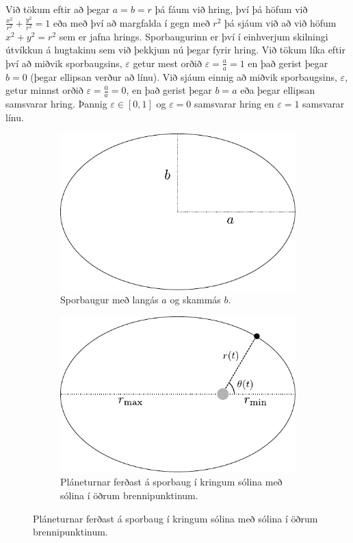 \ifdefined \wholebook \else\documentclass[oneside]{book}\usepackage{EdlBook}\graphicspath{{figures/}}
\begin{document}
Við tökum eftir að þegar $a = b = r$ þá fáum við hring, því þá höfum við $\frac{x^2}{r^2}+ \frac{y^2}{r^2} = 1$ eða með því að margfalda í gegn með $r^2$ þá sjáum við að við höfum $x^2 + y^2 = r^2$ sem er jafna hrings. Sporbaugurinn er því í einhverjum skilningi útvíkkun á hugtakinu sem við þekkjum nú þegar fyrir hring. Við tökum líka eftir því að miðvik sporbaugsins, $\varepsilon$ getur mest orðið $\varepsilon = \frac{a}{a} = 1$ en það gerist þegar $b = 0$ (þegar ellipsan verður að línu). Við sjáum einnig að miðvik sporbaugsins, $\varepsilon$, getur minnst orðið $\varepsilon = \frac{0}{a} = 0$, en það gerist þegar $b = a$ eða þegar ellipsan samsvarar hring. Þannig $\varepsilon \in [0,1]$ og $\varepsilon = 0$ samsvarar hring en $\varepsilon = 1$ samsvarar línu. 

\begin{figure}[H]
    \centering
\begin{subfigure}[h]{.4\textwidth}
    \centering
    \includegraphics[width=\linewidth]{figures/ellipse1.pdf}
    \caption{Sporbaugur með langás $a$ og skammás $b$.}
    \label{fig:ellipse}
\end{subfigure}
\hfill
\begin{subfigure}[h]{.4\textwidth}
    \centering
    \includegraphics[width=\linewidth]{figures/keplerfirstlaw}
    \caption{Pláneturnar ferðast á sporbaug í kringum sólina með sólina í öðrum brennipunktinum.}
    \label{subfig:FirstKepler}
\end{subfigure}
\end{figure}
\end{document}
